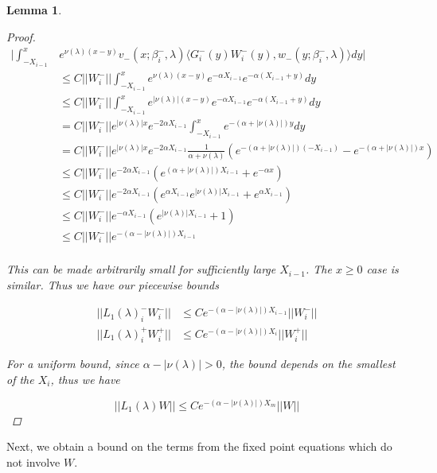 \documentclass[12pt]{article}
\newtheorem{lemma}{Lemma}
\begin{document}
\begin{lemma}
\begin{proof}
\begin{align*}
\Big| \int_{-X_{i-1}}^x &e^{\nu(\lambda)(x-y)} v_-(x; \beta_i^-, \lambda) \langle G_i^-(y)W_i^-(y), w_-(y; \beta_i^-, \lambda) \rangle dy \Big| \\
&\leq C ||W_i^-|| \int_{-X_{i-1}}^x e^{\nu(\lambda)(x-y)} e^{-\alpha X_{i-1}}e^{-\alpha(X_{i-1} + y)}dy \\
&\leq C ||W_i^-|| \int_{-X_{i-1}}^x e^{|\nu(\lambda)| (x-y)} e^{-\alpha X_{i-1}}e^{-\alpha(X_{i-1} + y)}dy \\
&= C ||W_i^-|| e^{|\nu(\lambda)| x } e^{-2 \alpha X_{i-1}} \int_{-X_{i-1}}^x e^{-(\alpha + |\nu(\lambda)|) y} dy \\
&= C ||W_i^-|| e^{|\nu(\lambda)| x } e^{-2 \alpha X_{i-1}} \frac{1}{\alpha + \nu(\lambda)} \left( e^{-(\alpha + |\nu(\lambda)|)(-X_{i-1})} - e^{-(\alpha + |\nu(\lambda)|)x} \right) \\
&\leq C ||W_i^-|| e^{-2 \alpha X_{i-1}} \left( e^{(\alpha + |\nu(\lambda)|)X_{i-1}} + e^{-\alpha x}  \right) \\
&\leq C ||W_i^-|| e^{-2 \alpha X_{i-1}} \left( e^{\alpha X_{i-1}} e^{|\nu(\lambda)|X_{i-1}} + e^{\alpha X_{i-1}}  \right) \\
&\leq C ||W_i^-|| e^{-\alpha X_{i-1}} \left( e^{|\nu(\lambda)|X_{i-1}} + 1 \right) \\
&\leq C ||W_i^-|| e^{-(\alpha -|\nu(\lambda)|)X_{i-1}} \\
\end{align*}

This can be made arbitrarily small for sufficiently large $X_{i-1}$. The $x \geq 0$ case is similar. Thus we have our piecewise bounds

\begin{align*}
||L_1(\lambda)_i^- W_i^-|| &\leq C e^{-(\alpha -|\nu(\lambda)|)X_{i-1}} ||W_i^-|| \\
||L_1(\lambda)_i^+ W_i^+|| &\leq C e^{-(\alpha -|\nu(\lambda)|)X_i} ||W_i^+||
\end{align*}

For a uniform bound, since $\alpha -|\nu(\lambda)| > 0$, the bound depends on the smallest of the $X_i$, thus we have

\[
||L_1(\lambda)W|| \leq C e^{-(\alpha -|\nu(\lambda)|)X_m}||W||
\]

\end{proof}
\end{lemma}

Next, we obtain a bound on the terms from the fixed point equations which do not involve $W$. 
\end{document}
